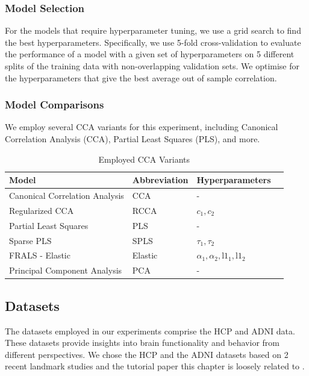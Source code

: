 \subsubsection{Model Selection}

For the models that require hyperparameter tuning, we use a grid search to find the best hyperparameters.
Specifically, we use 5-fold cross-validation to evaluate the performance of a model with a given set of hyperparameters on 5 different splits of the training data with non-overlapping validation sets.
We optimise for the hyperparameters that give the best average out of sample correlation.

\subsubsection{Model Comparisons}
We employ several CCA variants for this experiment, including Canonical Correlation Analysis (CCA), Partial Least Squares (PLS), and more.

\begin{table}[h]
\centering
\caption{Employed CCA Variants}
\begin{tabular}{|l|l|l|l|}
\hline
\textbf{Model} & \textbf{Abbreviation} & \textbf{Hyperparameters}  \\
\hline
Canonical Correlation Analysis & CCA & -   \\
\hline
Regularized CCA & RCCA & \(c_1, c_2\)   \\
\hline
Partial Least Squares & PLS & -   \\
\hline
Sparse PLS & SPLS & \(\tau_1, \tau_2\)   \\
\hline
FRALS - Elastic & Elastic & \(\alpha_1, \alpha_2, \text{l1}_1, \text{l1}_2\)   \\
\hline
Principal Component Analysis & PCA & -  \\
\hline
\end{tabular}\label{table:cca-variants}
\end{table}

\subsection{Datasets}\label{subsec:datasets}

The datasets employed in our experiments comprise the HCP and ADNI data.
These datasets provide insights into brain functionality and behavior from different perspectives.
We chose the HCP and the ADNI datasets based on 2 recent landmark studies and the tutorial paper this chapter is loosely related to \cite{mihalik2022canonical}.

